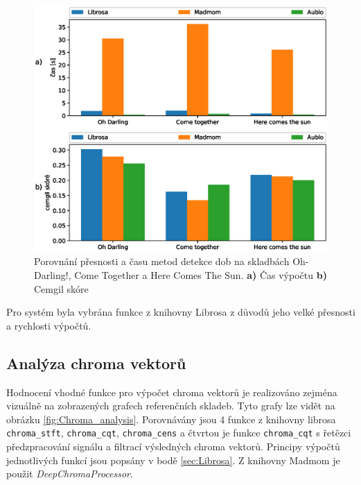 \begin{figure}[H]
    \centering
    \includegraphics[width = 1\linewidth]{obrazky/Beat_tracking_time_and_cemgil_graphs.eps}
    \caption{Porovnání přesnosti a času metod detekce dob na skladbách Oh-Darling!, Come Together a Here Comes The Sun. \textbf{a)} Čas výpočtu \textbf{b)} Cemgil skóre}
    \label{fig:Beat_tracking_time_and_cemgil}
\end{figure}

Pro systém byla vybrána funkce z knihovny Librosa z důvodů jeho velké přesnosti a rychlosti výpočtů.

\subsection{Analýza chroma vektorů}

Hodnocení vhodné funkce pro výpočet chroma vektorů je realizováno zejména vizuálně na zobrazených grafech referenčních skladeb. Tyto grafy lze vidět na obrázku \ref{fig:Chroma_analysis}. Porovnávány jsou 4 funkce z knihovny librosa \texttt{chroma\_stft}, \texttt{chroma\_cqt}, \texttt{chroma\_cens} a čtvrtou je funkce \texttt{chroma\_cqt} s řetězci předzpracování signálu a filtrací výsledných chroma vektorů. Principy výpočtů jednotlivých funkcí jsou popsány v bodě \ref{sec:Librosa}. Z knihovny Madmom je použit \textit{DeepChromaProcessor}.

